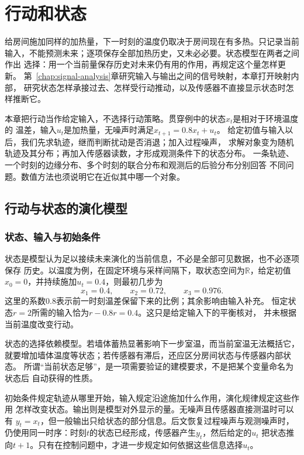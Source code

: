 \chapter{行动和状态}
\label{chap:dynamical-systems-and-state-estimation}
\label{chap:action-and-state}

给房间施加同样的加热量，下一时刻的温度仍取决于房间现在有多热。只记录当前
输入，不能预测未来；逐项保存全部加热历史，又未必必要。状态模型在两者之间作出
选择：用一个当前量保存历史对未来仍有用的作用，再规定这个量怎样更新。
第~\ref{chap:signal-analysis}章研究输入与输出之间的信号映射，本章打开映射内部，
研究状态怎样承接过去、怎样受行动推动，以及传感器不直接显示状态时怎样推断它。

本章把行动当作给定输入，不选择行动策略。贯穿例中的状态$x_t$是相对于环境温度的
温差，输入$u_t$是加热量，无噪声时满足$x_{t+1}=0.8x_t+u_t$。
给定初值与输入以后，我们先求轨迹，继而判断扰动是否消退；加入过程噪声，
求解对象变为随机轨迹及其分布；再加入传感器读数，才形成观测条件下的状态分布。
一条轨迹、一个时刻的边缘分布、多个时刻的联合分布和观测后的后验分布分别回答
不同问题。数值方法也须说明它在近似其中哪一个对象。

\section{行动与状态的演化模型}
\label{sec:dynamical-difference-ode}

\subsection{状态、输入与初始条件}

状态是模型认为足以接续未来演化的当前信息，不必是全部可见数据，也不必逐项保存
历史。以温度为例，在固定环境与采样间隔下，取状态空间为$\mathbb R$，给定初值
$x_0=0$，并持续施加$u_t=0.4$，则最初几步为
\[
  x_1=0.4,\qquad x_2=0.72,\qquad x_3=0.976.
\]
这里的系数$0.8$表示前一时刻温差保留下来的比例；其余影响由输入补充。
恒定状态$r=2$所需的输入恰为$r-0.8r=0.4$。这只是给定输入下的平衡核对，
并未根据当前温度改变行动。

状态的选择依赖模型。若墙体蓄热显著影响下一步室温，而当前室温无法概括它，
就要增加墙体温度等状态；若传感器有滞后，还应区分房间状态与传感器内部状态。
所谓“当前状态足够”，是一项需要验证的建模要求，不是把某个变量命名为状态后
自动获得的性质。

初始条件规定轨迹从哪里开始，输入规定沿途施加什么作用，演化规律规定这些作用
怎样改变状态。输出则是模型对外显示的量。无噪声且传感器直接测温时可以有
$y_t=x_t$，但一般输出只给状态的部分信息。后文恢复过程噪声与观测噪声时，
仍使用同一时序：时刻$t$的状态已经形成，传感器产生$y_t$，然后给定的$u_t$
把状态推向$t+1$。只有在控制问题中，才进一步规定如何依据这些信息选择$u_t$。

